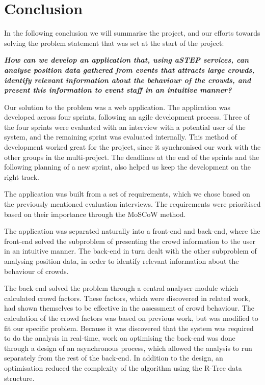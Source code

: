 \chapter{Conclusion}\label{ch:conclusion}


In the following conclusion we will summarise the project, and our efforts towards solving the problem statement that was set at the start of the project:

\vspace{0.5 cm}
\begin{center}
	\textbf{\textit{How can we develop an application that, using aSTEP services, can analyse position data gathered from events that attracts large crowds, identify relevant information about the behaviour of the crowds, and present this information to event staff in an intuitive manner?}}
\end{center}

Our solution to the problem was a web application. The application was developed across four sprints, following an agile development process. Three of the four sprints were evaluated with an interview with a potential user of the system, and the remaining sprint was evaluated internally. This method of development worked great for the project, since it synchronised our work with the other groups in the multi-project. The deadlines at the end of the sprints and the following planning of a new sprint, also helped us keep the development on the right track.

The application was built from a set of requirements, which we chose based on the previously mentioned evaluation interviews. The requirements were prioritised based on their importance through the MoSCoW method.

The application was separated naturally into a front-end and back-end, where the front-end solved the subproblem of presenting the crowd information to the user in an intuitive manner. The back-end in turn dealt with the other subproblem of analysing position data, in order to identify relevant information about the behaviour of crowds.

The back-end solved the problem through a central analyser-module which calculated crowd factors. These factors, which were discovered in related work, had shown themselves to be effective in the assessment of crowd behaviour. The calculation of the crowd factors was based on previous work, but was modified to fit our specific problem. Because it was discovered that the system was required to do the analysis in real-time, work on optimising the back-end was done through a design of an asynchronous process, which allowed the analysis to run separately from the rest of the back-end. In addition to the design, an optimisation reduced the complexity of the algorithm using the R-Tree data structure.

